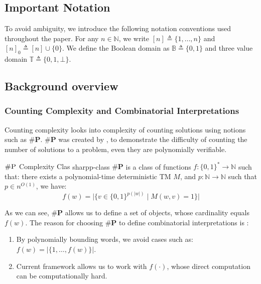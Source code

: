 
\subsection{Important Notation}

To avoid ambiguity, we introduce the following notation conventions used throughout the paper.
For any $n \in \mathbb{N}$, we write $[n] \triangleq \{1, \ldots, n\}$  and $[n]_0 \triangleq [n] \cup \{0\}$. 
We define the Boolean domain as $\mathbb{B} \triangleq \{0, 1\}$ and
three value domain $\mathbb{T} \triangleq \{0, 1, \bot\}$.


\subsection{Background overview}


\subsubsection{Counting Complexity and Combinatorial Interpretations}

Counting complexity looks into complexity of counting solutions using notions
such as $\textbf{\#P}$.
$\textbf{\#P}$ was created by \cite{valiant_ComplexityComputingPermanent_1979},
to demonstrate the difficulty of counting the number of solutions to a problem,
even they are polynomially verifiable.

\begin{definitionbox}{$\textsc{\#P}$ Complexity Clas \cite{valiant_ComplexityComputingPermanent_1979}}{sharpp-class}
    $\textbf{\#P}$ is a class of functions $f: \{0,1\}^* \to \mathbb{N}$
    such that: there
    exists a polynomial-time deterministic TM $M$, and
    $p : \mathbb{N} \to \mathbb{N}$ such that $p \in n^{O(1)}$, we have:
    $$
    f(w) = \Big|\Big\{v \in \{0,1\}^{p(|w|)} \mid M(w, v) =1 \Big\}\Big|
    $$
\end{definitionbox}


As we can see, $\textbf{\#P}$ allows us to define a set of objects,
whose cardinality equals $f(w)$. The reason for choosing
$\textbf{\#P}$ to define combinatorial interpretations is \cite{ikenmeyer_PositivitySymmetricGroup_2024}: 

\begin{enumerate}
    \item By polynomially bounding words, we avoid cases such as: $f(w) = |\{1, \hdots, f(w)\}|$.
    \item Current framework allows us to work with $f(\cdot)$, whose direct computation can be computationally hard.
\end{enumerate}


